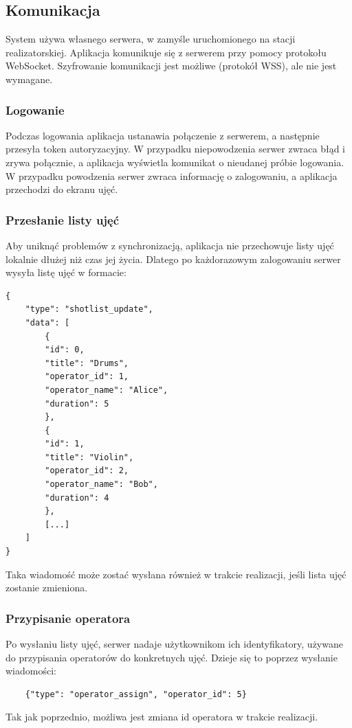 \documentclass[11pt, letterpaper]{article}
\begin{document}
\subsection{Komunikacja}
System używa własnego serwera, w zamyśle uruchomionego na stacji realizatorskiej. Aplikacja komunikuje się z serwerem przy pomocy protokołu WebSocket. Szyfrowanie komunikacji jest możliwe (protokół WSS), ale nie jest wymagane.
\subsubsection{Logowanie}
Podczas logowania aplikacja ustanawia połączenie z serwerem, a następnie przesyła token autoryzacyjny. W przypadku niepowodzenia serwer zwraca błąd i zrywa połącznie, a aplikacja wyświetla komunikat o nieudanej próbie logowania. W przypadku powodzenia serwer zwraca informację o zalogowaniu, a aplikacja przechodzi do ekranu ujęć.

\subsubsection{Przesłanie listy ujęć}
Aby uniknąć problemów z synchronizacją, aplikacja nie przechowuje listy ujęć lokalnie dłużej niż czas jej życia. Dlatego po każdorazowym zalogowaniu serwer wysyła listę ujęć w formacie:
\begin{verbatim}
{
    "type": "shotlist_update",
    "data": [
        {
        "id": 0,
        "title": "Drums",
        "operator_id": 1,
        "operator_name": "Alice",
        "duration": 5
        },
        {
        "id": 1,
        "title": "Violin",
        "operator_id": 2,
        "operator_name": "Bob",
        "duration": 4
        },
        [...]
    ]
}
\end{verbatim}
Taka wiadomość może zostać wysłana również w trakcie realizacji, jeśli lista ujęć zostanie zmieniona.

\subsubsection{Przypisanie operatora}
Po wysłaniu listy ujęć, serwer nadaje użytkownikom ich identyfikatory, używane do przypisania operatorów do konkretnych ujęć. Dzieje się to poprzez wysłanie wiadomości:
\begin{verbatim}
    {"type": "operator_assign", "operator_id": 5}
\end{verbatim}
Tak jak poprzednio, możliwa jest zmiana id operatora w trakcie realizacji.
\end{document}
